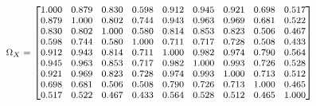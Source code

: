 \documentclass{article}
\begin{document}
\begin{equation*}
\begin{medsize}
\Omega_X=%
\begin{bmatrix}{}
  1.000 & 0.879 & 0.830 & 0.598 & 0.912 & 0.945 & 0.921 & 0.698 & 0.517 \\ 
  0.879 & 1.000 & 0.802 & 0.744 & 0.943 & 0.963 & 0.969 & 0.681 & 0.522 \\ 
  0.830 & 0.802 & 1.000 & 0.580 & 0.814 & 0.853 & 0.823 & 0.506 & 0.467 \\ 
  0.598 & 0.744 & 0.580 & 1.000 & 0.711 & 0.717 & 0.728 & 0.508 & 0.433 \\ 
  0.912 & 0.943 & 0.814 & 0.711 & 1.000 & 0.982 & 0.974 & 0.790 & 0.564 \\ 
  0.945 & 0.963 & 0.853 & 0.717 & 0.982 & 1.000 & 0.993 & 0.726 & 0.528 \\ 
  0.921 & 0.969 & 0.823 & 0.728 & 0.974 & 0.993 & 1.000 & 0.713 & 0.512 \\ 
  0.698 & 0.681 & 0.506 & 0.508 & 0.790 & 0.726 & 0.713 & 1.000 & 0.465 \\ 
  0.517 & 0.522 & 0.467 & 0.433 & 0.564 & 0.528 & 0.512 & 0.465 & 1.000 \\ 
  \end{bmatrix}
\end{medsize}
\end{equation*}
\end{document}
